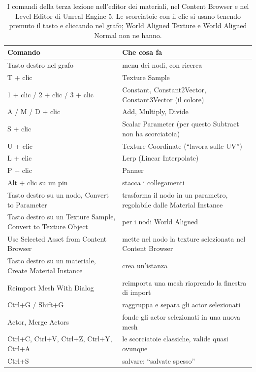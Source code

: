 \begin{table}[htbp]
\centering
\small
\begin{tabular}{@{}p{4.4cm}p{8.6cm}@{}}
\toprule
\textbf{Comando} & \textbf{Che cosa fa} \\
\midrule
Tasto destro nel grafo & menu dei nodi, con ricerca \\
T + clic & Texture Sample \\
1 + clic / 2 + clic / 3 + clic & Constant, Constant2Vector, Constant3Vector (il
  colore) \\
A / M / D + clic & Add, Multiply, Divide \\
S + clic & Scalar Parameter (per questo Subtract non ha scorciatoia) \\
U + clic & Texture Coordinate (``lavora sulle UV'') \\
L + clic & Lerp (Linear Interpolate) \\
P + clic & Panner \\
Alt + clic su un pin & stacca i collegamenti \\
Tasto destro su un nodo, Convert to Parameter & trasforma il nodo in un parametro,
  regolabile dalle Material Instance \\
Tasto destro su un Texture Sample, Convert to Texture Object & per i nodi World Aligned \\
Use Selected Asset from Content Browser & mette nel nodo la texture selezionata nel
  Content Browser \\
Tasto destro su un materiale, Create Material Instance & crea un'istanza \\
Reimport Mesh With Dialog & reimporta una mesh riaprendo la finestra di import \\
Ctrl+G / Shift+G & raggruppa e separa gli actor selezionati \\
Actor, Merge Actors & fonde gli actor selezionati in una nuova mesh \\
Ctrl+C, Ctrl+V, Ctrl+Z, Ctrl+Y, Ctrl+A & le scorciatoie classiche, valide quasi
  ovunque \\
Ctrl+S & salvare: ``salvate spesso'' \\
\bottomrule
\end{tabular}
\caption{I comandi della terza lezione nell'editor dei materiali, nel Content Browser e
nel Level Editor di Unreal Engine 5. Le scorciatoie con il clic si usano tenendo premuto
il tasto e cliccando nel grafo; World Aligned Texture e World Aligned Normal non ne
hanno.}
\label{ue3:tab:scorciatoie}
\end{table}

